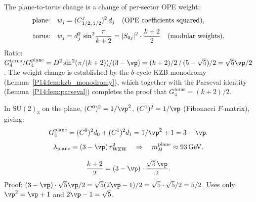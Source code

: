 \begin{remark}
\label{P14:rem:modular_renorm}
The plane-to-torus change is a change of per-sector OPE weight:
\begin{align}
  \text{plane:}&\quad w_j = (C^j_{1/2,\,1/2})^2\,d_j\quad\text{(OPE coefficients squared)},\notag\\
  \text{torus:}&\quad w_j = d_j^2\,\sin^2\!\frac{\pi}{k+2} = |S_{0j}|^2\cdot\frac{k+2}{2}\quad\text{(modular weights)}.
\end{align}
Ratio: $G_4^{\mathrm{torus}}/G_4^{\mathrm{plane}} = D^2\sin^2(\pi/(k+2))/(3-\vp)
= (k+2)/2\,/\,(5-\sqrt{5})/2 = \sqrt{5}\vp/2$.
The weight change is established by the $b$-cycle KZB monodromy (Lemma~\ref{P14:lem:kzb_monodromy}),
which together with the Parseval identity (Lemma~\ref{P14:lem:parseval}) completes the proof
that $G_4^{\mathrm{torus}}=(k+2)/2$.
\end{remark}

\begin{lemma}
\label{P14:lem:fmatrix_plane}
In $\mathrm{SU}(2)_3$ on the plane, $(C^0)^2 = 1/\vp^2$,
$(C^1)^2 = 1/\vp$ (Fibonacci $F$-matrix), giving:
\begin{equation}
  G_4^{\mathrm{plane}} = (C^0)^2 d_0 + (C^1)^2 d_1
  = 1/\vp^2 + 1 = 3-\vp.
  \label{P14:eq:G4plane}
\end{equation}
\begin{equation}
  \lambda_{\mathrm{plane}} = (3-\vp)\,r_{\mathrm{WZW}}^2
  \quad\Rightarrow\quad
  m_H^{\mathrm{plane}} \approx 93\,\mathrm{GeV}.
  \label{P14:eq:lambda_plane}
\end{equation}
\end{lemma}

\begin{theorem}
\label{P14:thm:higgs_algebra}
\begin{equation}
  \frac{k+2}{2} = (3-\vp)\cdot\frac{\sqrt{5}\,\vp}{2}.
  \label{P14:eq:higgs_closure}
\end{equation}
Proof: $(3-\vp)\cdot\sqrt{5}\vp/2 = \sqrt{5}(2\vp-1)/2 = \sqrt{5}\cdot\sqrt{5}/2 = 5/2$.
Uses only $\vp^2=\vp+1$ and $2\vp-1=\sqrt{5}$.
\end{theorem}

